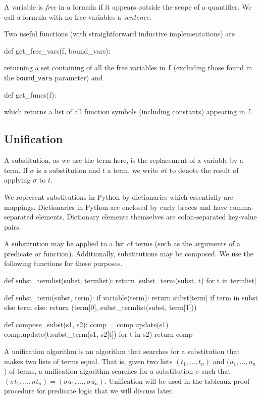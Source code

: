 \documentclass[a4paper,notitlepage]{scrartcl}
\begin{document}
A variable is \emph{free} in a formula if it appears outside the scope
   of a quantifier.
We call a formula with no free variables a \emph{sentence}.

Two useful functions (with straightforward inductive implementations) are
\begin{code}
def get_free_vars(f, bound_vars):
\end{code}
returning a set containing of all the free variables in \texttt{f} (excluding those
   found in the \texttt{bound\_vars} parameter) and
\begin{code}
def get_funcs(f):
\end{code}
which returns a list of all function symbols (including constants) appearing
   in \texttt{f}.

\subsection{Unification}

A substitution, as we use the term here, is the replacement of a variable by a
term. If $\sigma$ is a substitution and $t$ a term, we write $\sigma t$ to
denote the result of applying $\sigma$ to $t$.

We represent substitutions in Python by dictionaries which essentially are
mappings. Dictionaries in Python are enclosed by curly braces and have
comma-separated elements. Dictionary elements themselves are colon-separated
key-value pairs.

A substitution may be applied to a list of terms (such as the arguments of a
predicate or function). Additionally, substitutions may be composed. We use the
following functions for these purposes.

\begin{code}
def subst_termlist(subst, termlist):
    return [subst_term(subst, t) for t in termlist]

def subst_term(subst, term):
    if variable(term):
        return subst[term] if term in subst else term
    else:
        return (term[0], subst_termlist(subst, term[1]))

def compose_subst(s1, s2):
    comp = {}
    comp.update(s1)
    comp.update({t:subst_term(s1, s2[t]) for t in s2})
    return comp
\end{code}

A unification algorithm is an algorithm that searches for a substitution that
makes two lists of terms equal. That is, given two lists $(t_1, \ldots, t_n)$
and $(u_1, \ldots, u_n$) of terms, a unification algorithm searches for a
substitution $\sigma$ such that $(\sigma t_1, \ldots, \sigma t_n) = (\sigma
u_1, \ldots, \sigma u_n)$. Unification will be used in the tableaux proof
procedure for predicate logic that we will discuss later.
\end{document}
